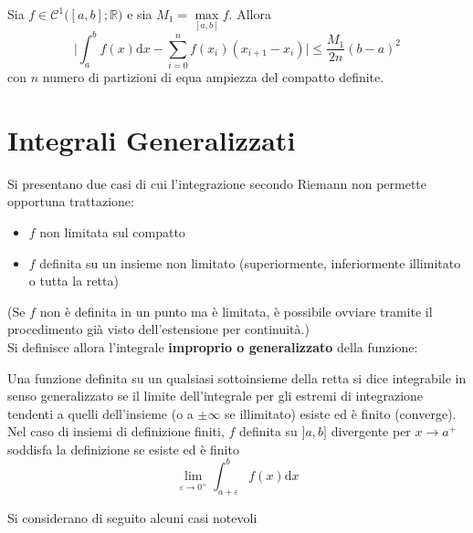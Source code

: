 \documentclass[10pt, oneside]{book}
\theoremstyle{plain}
\begin{document}
\begin{ther}
    Sia $f \in \mathcal{C}^1\big([a,b] ; \mathbb{R}\big)$ e sia $M_1 = \max\limits_{[a,b]} f$. Allora
    \[\bigg|\int_{a}^{b} f(x)\textrm{d}x - \sum\limits_{i=0}^n f(x_i) (x_{i+1} - x_i)\bigg| \leq \frac{M_1}{2n}(b-a)^2\]
    con $n$ numero di partizioni di equa ampiezza del compatto definite.
\end{ther}

\section{Integrali Generalizzati}
Si presentano due casi di cui l'integrazione secondo Riemann non permette opportuna trattazione:
\begin{itemize}
    \item $f$ non limitata sul compatto
    \item $f$ definita su un insieme non limitato (superiormente, inferiormente illimitato o tutta la retta)
\end{itemize}
(Se $f$ non è definita in un punto ma è limitata, è possibile ovviare tramite il procedimento già visto dell'estensione per continuità.)
\\Si definisce allora l'integrale \textbf{improprio o generalizzato} della funzione:
\begin{defin}
    Una funzione definita su un qualsiasi sottoinsieme della retta si dice integrabile in senso generalizzato se il limite dell'integrale per gli estremi di integrazione tendenti a quelli dell'insieme (o a $\pm \infty$ se illimitato) esiste ed è finito (converge). 
    \\Nel caso di insiemi di definizione finiti, $f$ definita su $]a,b]$ divergente per $x \rightarrow a^+$ soddisfa la definizione se esiste ed è finito
    \[\lim\limits_{\varepsilon \rightarrow 0^+} \int_{a + \varepsilon}^b f(x)\textrm{d}x\]
\end{defin}
Si considerano di seguito alcuni casi notevoli
\end{document}
